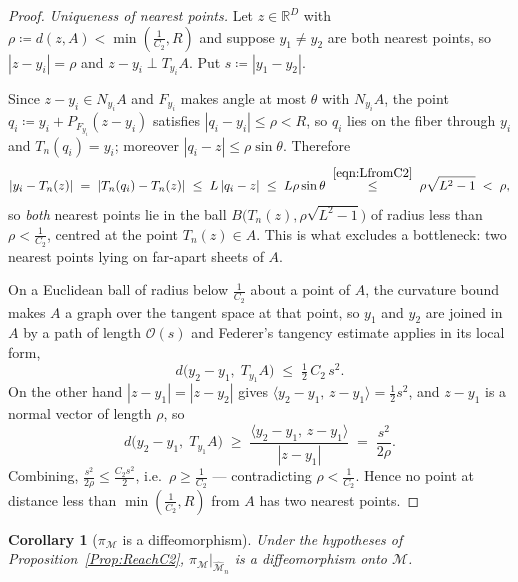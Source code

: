\documentclass[11pt]{amsart}%
\theoremstyle{plain}
\newtheorem{corollary}[definition]{Corollary}
\newcommand{\R}{{\mathbb R}}
\newcommand{\1}{\mathbf{1}}
\newcommand{\M}{\mathcal{M}}
\begin{document}
\begin{proof}
    \emph{Uniqueness of nearest points.} Let $z\in\R^D$ with $\rho\coloneqq d(z,A)<\min\left(\frac{1}{C_2},R\right)$
    and suppose $y_1\neq y_2$ are both nearest points, so $|z-y_i|=\rho$ and $z-y_i\perp T_{y_i}A$.
    Put $s\coloneqq|y_1-y_2|$.

    Since $z-y_i\in N_{y_i}A$ and $F_{y_i}$ makes angle at most $\theta$ with $N_{y_i}A$, the point
    $q_i\coloneqq y_i+P_{F_{y_i}}(z-y_i)$ satisfies $|q_i-y_i|\le\rho<R$, so $q_i$ lies on the fiber
    through $y_i$ and $T_n(q_i)=y_i$; moreover $|q_i-z|\le\rho\sin\theta$. Therefore
    \[
        |y_i-T_n(z)|\;=\;|T_n(q_i)-T_n(z)|\;\le\;L\,|q_i-z|\;\le\;L\rho\sin\theta
        \;\overset{\eqref{eqn:LfromC2}}{\le}\;\rho\sqrt{L^2-1}\;<\;\rho ,
    \]
    so \emph{both} nearest points lie in the ball $B\bigl(T_n(z),\rho\sqrt{L^2-1}\bigr)$ of radius
    less than $\rho<\frac{1}{C_2}$, centred at the point $T_n(z)\in A$. This is what excludes a bottleneck:
    two nearest points lying on far-apart sheets of $A$.

    On a Euclidean ball of radius below $\frac{1}{C_2}$ about a point of $A$, the curvature bound makes $A$
    a graph over the tangent space at that point, so $y_1$ and $y_2$ are joined in $A$ by a path of
    length $\mathcal{O}(s)$ and Federer's tangency estimate applies in its local form,
    \[
        d\bigl(y_2-y_1,\;T_{y_1}A\bigr)\;\le\;\tfrac12\,C_2\,s^2 .
    \]
    On the other hand $|z-y_1|=|z-y_2|$ gives $\langle y_2-y_1,\,z-y_1\rangle=\tfrac12 s^2$, and
    $z-y_1$ is a normal vector of length $\rho$, so
    \[
        d\bigl(y_2-y_1,\;T_{y_1}A\bigr)\;\ge\;
        \frac{\langle y_2-y_1,\,z-y_1\rangle}{|z-y_1|}\;=\;\frac{s^2}{2\rho}.
    \]
    Combining, $\frac{s^2}{2\rho}\le \frac{C_2s^2}{2}$, i.e.\ $\rho\ge\frac{1}{C_2}$ --- contradicting $\rho<\frac{1}{C_2}$. Hence
    no point at distance less than $\min\left(\frac{1}{C_2},R\right)$ from $A$ has two nearest points.
\end{proof}

\begin{corollary}[$\pi_\M$ is a diffeomorphism]
    \label{Cor:Diffeo}
    Under the hypotheses of Proposition~\ref{Prop:ReachC2}, $\pi_\M|_{\widehat{\M}_n}$ is a
    diffeomorphism onto $\M$.
\end{corollary}
\end{document}
